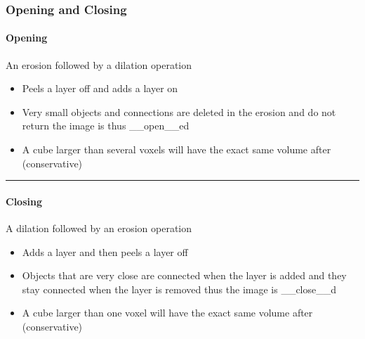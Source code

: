 \documentclass[letterpaper,10pt,english]{sphinxmanual}
\begin{document}
\begin{sphinxVerbatim}[commandchars=\\\{\}]
\PYG{p}{[}\PYG{p}{]} \PYG{p}{[}\PYG{p}{]}\PYG{p}{[}\PYG{p}{]}
\end{sphinxVerbatim}

\noindent{}


\subsubsection{Opening and Closing}
\label{\detokenize{04-BasicSegmentation_Part2:opening-and-closing}}

\paragraph{Opening}
\label{\detokenize{04-BasicSegmentation_Part2:opening}}
\sphinxAtStartPar
An erosion followed by a dilation operation
\begin{itemize}
\item {} 
\sphinxAtStartPar
Peels a layer off and adds a layer on

\item {} 
\sphinxAtStartPar
Very small objects and connections are deleted in the erosion and do not return the image is thus \_\_open\_\_ed

\item {} 
\sphinxAtStartPar
A cube larger than several voxels will have the exact same volume after (conservative)

\end{itemize}


\bigskip\hrule\bigskip



\paragraph{Closing}
\label{\detokenize{04-BasicSegmentation_Part2:closing}}
\sphinxAtStartPar
A dilation followed by an erosion operation
\begin{itemize}
\item {} 
\sphinxAtStartPar
Adds a layer and then peels a layer off

\item {} 
\sphinxAtStartPar
Objects that are very close are connected when the layer is added and they stay connected when the layer is removed thus the image is \_\_close\_\_d

\item {} 
\sphinxAtStartPar
A cube larger than one voxel will have the exact same volume after (conservative)

\end{itemize}
\end{document}
